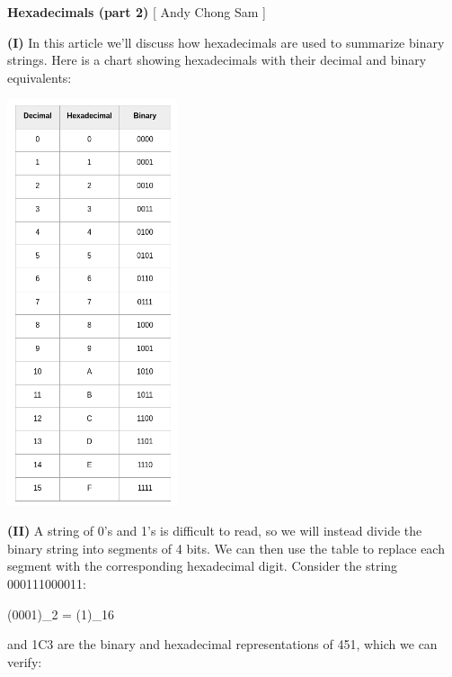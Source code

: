 \documentclass[12pt]{article}
\begin{document}
	
	\begin{center}
		\par\noindent \large \textbf{Hexadecimals (part 2)}  [ Andy Chong Sam ]
	\end{center}
	\begin{minipage}[t]{.5\linewidth}
		\par\noindent\textbf{(I)} In this article we'll discuss how hexadecimals are used to summarize binary strings. Here is a chart showing hexadecimals with their decimal and binary equivalents: 
		\begin{center}
			\includegraphics[width=5.0cm]{hex-chart.png}
		\end{center}
	
		\par\noindent \textbf{(II)} A string of 0's and 1's is difficult to read, so we will instead divide the binary string into segments of 4 bits. We can then use the table to replace each segment with the corresponding hexadecimal digit. Consider the string 000111000011:
		
		\begin{flalign*}
			(0001\;\;\;\;)_{2}  = (1\;)_{16}			
		\end{flalign*}
		
		\par{} and 1C3 are the binary and hexadecimal representations of 451, which we can verify:
		
	\end{minipage}	
\end{document}
